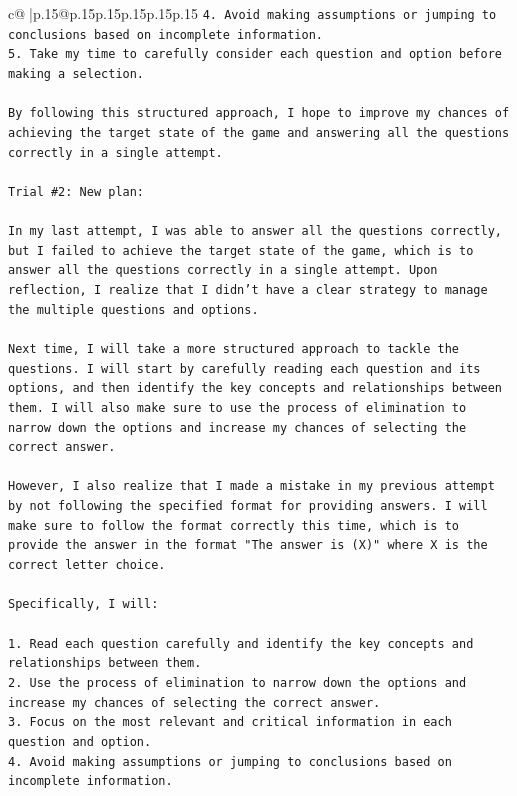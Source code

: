 \documentclass{article}
\begin{document}
{\begin{supertabular}{c@{$\;$}|p{.15\linewidth}@{}p{.15\linewidth}p{.15\linewidth}p{.15\linewidth}p{.15\linewidth}p{.15\linewidth}}
{{{\texttt{4. Avoid making assumptions or jumping to conclusions based on incomplete information.} \\
\texttt{5. Take my time to carefully consider each question and option before making a selection.} \\
\\ 
\texttt{By following this structured approach, I hope to improve my chances of achieving the target state of the game and answering all the questions correctly in a single attempt.} \\
\\ 
\texttt{Trial \#2: New plan: } \\
\\ 
\texttt{In my last attempt, I was able to answer all the questions correctly, but I failed to achieve the target state of the game, which is to answer all the questions correctly in a single attempt. Upon reflection, I realize that I didn't have a clear strategy to manage the multiple questions and options. } \\
\\ 
\texttt{Next time, I will take a more structured approach to tackle the questions. I will start by carefully reading each question and its options, and then identify the key concepts and relationships between them. I will also make sure to use the process of elimination to narrow down the options and increase my chances of selecting the correct answer.} \\
\\ 
\texttt{However, I also realize that I made a mistake in my previous attempt by not following the specified format for providing answers. I will make sure to follow the format correctly this time, which is to provide the answer in the format "The answer is (X)" where X is the correct letter choice.} \\
\\ 
\texttt{Specifically, I will:} \\
\\ 
\texttt{1. Read each question carefully and identify the key concepts and relationships between them.} \\
\texttt{2. Use the process of elimination to narrow down the options and increase my chances of selecting the correct answer.} \\
\texttt{3. Focus on the most relevant and critical information in each question and option.} \\
\texttt{4. Avoid making assumptions or jumping to conclusions based on incomplete information.} \\
}}}
\end{supertabular}}
\end{document}
